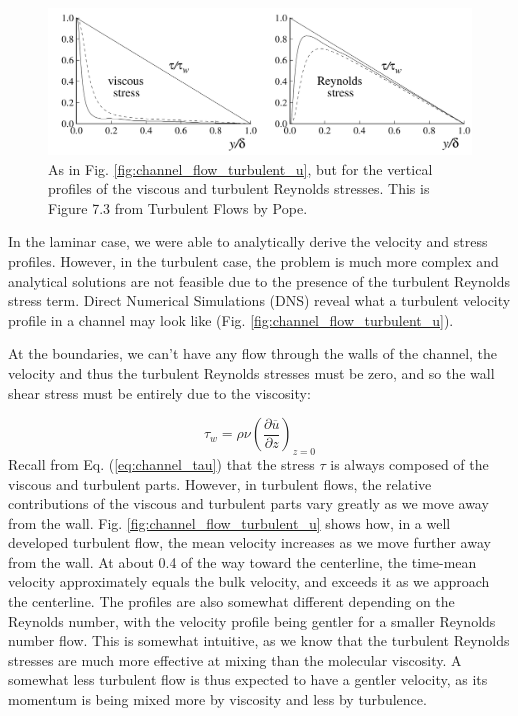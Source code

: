 \documentclass[12pt]{article}
\numberwithin{equation}{section}
\numberwithin{figure}{section}
\numberwithin{table}{section}
\begin{document}
\begin{figure}[h]
  \centering
  \includegraphics[width=\textwidth]{assets/fig_channel_flow_stress_profiles.png}
  \caption{
    As in Fig. \ref{fig:channel_flow_turbulent_u}, but for the vertical profiles
    of the viscous and turbulent Reynolds stresses.
    This is Figure 7.3 from Turbulent Flows by Pope.
  }
  \label{fig:channel_flow_stress_profiles}
\end{figure}
In the laminar case, we were able to analytically derive the velocity and stress
profiles.
However, in the turbulent case, the problem is much more complex and analytical
solutions are not feasible due to the presence of the turbulent Reynolds stress
term.
Direct Numerical Simulations (DNS) reveal what a turbulent velocity profile
in a channel may look like (Fig. \ref{fig:channel_flow_turbulent_u}).

At the boundaries, we can't have any flow through the walls of the channel,
the velocity and thus the turbulent Reynolds stresses must be zero, and so the
wall shear stress must be entirely due to the viscosity:

\begin{equation}
  \tau_w = \rho \nu \left( \frac{\partial \overline{u}}{\partial z} \right)_{z=0}
  \label{eq:wall_stress}
\end{equation}
Recall from Eq. (\ref{eq:channel_tau}) that the stress $\tau$ is always composed
of the viscous and turbulent parts.
However, in turbulent flows, the relative contributions of the viscous and
turbulent parts vary greatly as we move away from the wall.
Fig. \ref{fig:channel_flow_turbulent_u} shows how, in a well developed turbulent
flow, the mean velocity increases as we move further away from the wall.
At about 0.4 of the way toward the centerline, the time-mean velocity
approximately equals the bulk velocity, and exceeds it as we approach the
centerline.
The profiles are also somewhat different depending on the Reynolds number, with
the velocity profile being gentler for a smaller Reynolds number flow.
This is somewhat intuitive, as we know that the turbulent Reynolds stresses
are much more effective at mixing than the molecular viscosity.
A somewhat less turbulent flow is thus expected to have a gentler velocity,
as its momentum is being mixed more by viscosity and less by turbulence.
\end{document}
